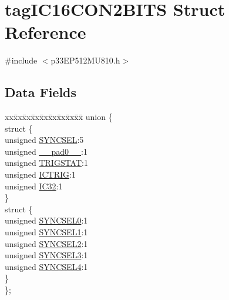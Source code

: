 \hypertarget{structtag_i_c16_c_o_n2_b_i_t_s}{}\section{tag\+I\+C16\+C\+O\+N2\+B\+I\+TS Struct Reference}
\label{structtag_i_c16_c_o_n2_b_i_t_s}


{\ttfamily \#include $<$p33\+E\+P512\+M\+U810.\+h$>$}

\subsection*{Data Fields}
\begin{DoxyCompactItemize}
\item 
\begin{tabbing}
xx\=xx\=xx\=xx\=xx\=xx\=xx\=xx\=xx\=\kill
union \{\\
\>struct \{\\
\>\>unsigned \hyperlink{structtag_i_c16_c_o_n2_b_i_t_s_a35fbbe11485c2615ed27535b62c3fa35}{SYNCSEL}:5\\
\>\>unsigned \hyperlink{structtag_i_c16_c_o_n2_b_i_t_s_adf71f3d8410c1f1dbbc96680a92c49af}{\_\_pad0\_\_}:1\\
\>\>unsigned \hyperlink{structtag_i_c16_c_o_n2_b_i_t_s_ab379549de54ac93ad4aa73686c34cb7c}{TRIGSTAT}:1\\
\>\>unsigned \hyperlink{structtag_i_c16_c_o_n2_b_i_t_s_a79bd14cfd2e403f3a96ce0b3bb58097b}{ICTRIG}:1\\
\>\>unsigned \hyperlink{structtag_i_c16_c_o_n2_b_i_t_s_afc705120246cb4ca0c93c87817519b7f}{IC32}:1\\
\>\} \\
\>struct \{\\
\>\>unsigned \hyperlink{structtag_i_c16_c_o_n2_b_i_t_s_a3b5df3154fde5141e6ac0156425ff8b4}{SYNCSEL0}:1\\
\>\>unsigned \hyperlink{structtag_i_c16_c_o_n2_b_i_t_s_a50e73f95ab1c258ddc64f69c0991deaf}{SYNCSEL1}:1\\
\>\>unsigned \hyperlink{structtag_i_c16_c_o_n2_b_i_t_s_a304907a5d2c4cbf1114a54642a85951e}{SYNCSEL2}:1\\
\>\>unsigned \hyperlink{structtag_i_c16_c_o_n2_b_i_t_s_a6bbd1bd2ead6c9fa713969c6eb0f0c75}{SYNCSEL3}:1\\
\>\>unsigned \hyperlink{structtag_i_c16_c_o_n2_b_i_t_s_a0cd5bbe196c7974953909d27a6307bb7}{SYNCSEL4}:1\\
\>\} \\
\}; \\

\end{tabbing}\end{DoxyCompactItemize}


